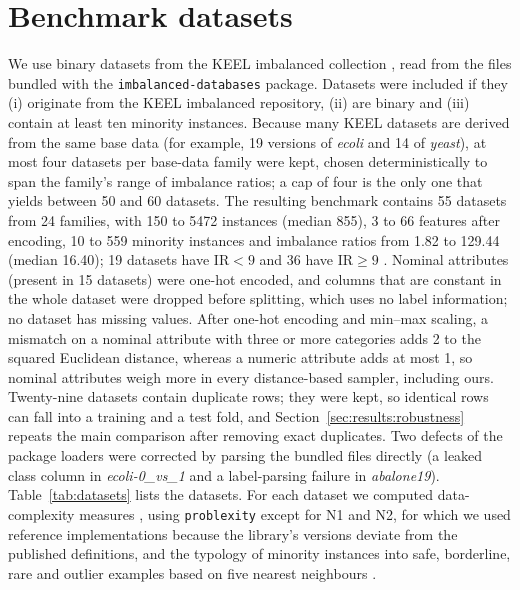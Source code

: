 \section{Benchmark datasets}\label{sec:design:data}

We use binary datasets from the KEEL imbalanced collection \citep{alcalafdez2011keel}, read from the files bundled with the \texttt{imbalanced-databases} package. Datasets were included if they (i) originate from the KEEL imbalanced repository, (ii) are binary and (iii) contain at least ten minority instances. Because many KEEL datasets are derived from the same base data (for example, 19 versions of \emph{ecoli} and 14 of \emph{yeast}), at most four datasets per base-data family were kept, chosen deterministically to span the family's range of imbalance ratios; a cap of four is the only one that yields between 50 and 60 datasets. The resulting benchmark contains 55 datasets from 24 families, with 150 to 5472 instances (median 855), 3 to 66 features after encoding, 10 to 559 minority instances and imbalance ratios from 1.82 to 129.44 (median 16.40); 19 datasets have $\mathrm{IR}<9$ and 36 have $\mathrm{IR}\ge 9$ \citep{fernandez2008study}. Nominal attributes (present in 15 datasets) were one-hot encoded, and columns that are constant in the whole dataset were dropped before splitting, which uses no label information; no dataset has missing values. After one-hot encoding and min--max scaling, a mismatch on a nominal attribute with three or more categories adds 2 to the squared Euclidean distance, whereas a numeric attribute adds at most 1, so nominal attributes weigh more in every distance-based sampler, including ours. Twenty-nine datasets contain duplicate rows; they were kept, so identical rows can fall into a training and a test fold, and Section~\ref{sec:results:robustness} repeats the main comparison after removing exact duplicates. Two defects of the package loaders were corrected by parsing the bundled files directly (a leaked class column in \emph{ecoli-0\_vs\_1} and a label-parsing failure in \emph{abalone19}). Table~\ref{tab:datasets} lists the datasets. For each dataset we computed data-complexity measures \citep{ho2002complexity,lorena2020how}, using \texttt{problexity} \citep{komorniczak2023problexity} except for N1 and N2, for which we used reference implementations because the library's versions deviate from the published definitions, and the typology of minority instances into safe, borderline, rare and outlier examples based on five nearest neighbours \citep{napierala2016types}.


